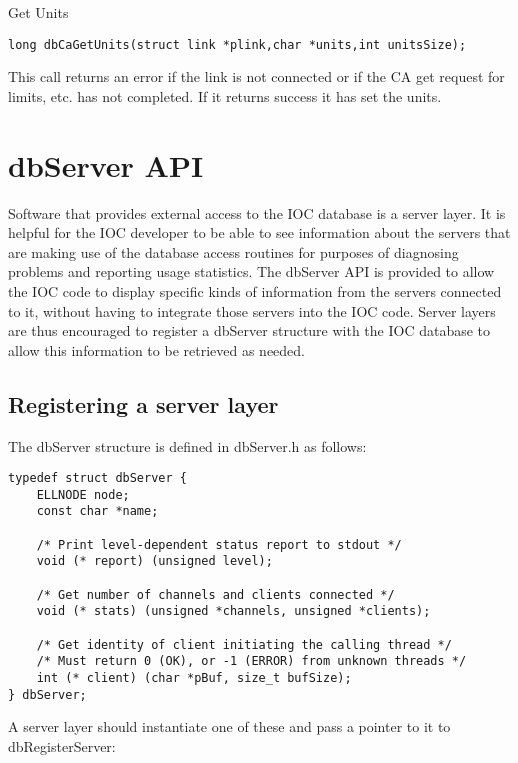 Get Units

\begin{verbatim}
long dbCaGetUnits(struct link *plink,char *units,int unitsSize);
\end{verbatim}

This call returns an error if the link is not connected or if the CA get request for limits, etc. has not completed.
If it returns success it has set the units.

\section{dbServer API}

Software that provides external access to the IOC database is a server layer.
It is helpful for the IOC developer to be able to see information about the servers that are making use of the database access routines for purposes of diagnosing problems and reporting usage statistics.
The dbServer API is provided to allow the IOC code to display specific kinds of information from the servers connected to it, without having to integrate those servers into the IOC code.
Server layers are thus encouraged to register a dbServer structure with the IOC database to allow this information to be retrieved as needed.

\subsection{Registering a server layer}

The dbServer structure is defined in dbServer.h as follows:

\begin{verbatim}
typedef struct dbServer {
    ELLNODE node;
    const char *name;

    /* Print level-dependent status report to stdout */
    void (* report) (unsigned level);

    /* Get number of channels and clients connected */
    void (* stats) (unsigned *channels, unsigned *clients);

    /* Get identity of client initiating the calling thread */
    /* Must return 0 (OK), or -1 (ERROR) from unknown threads */
    int (* client) (char *pBuf, size_t bufSize);
} dbServer;
\end{verbatim}

A server layer should instantiate one of these and pass a pointer to it to dbRegisterServer:

